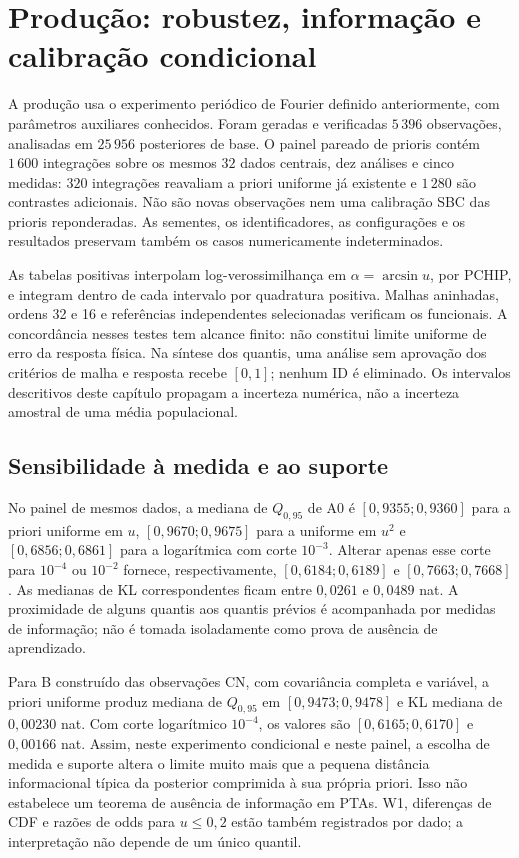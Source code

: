 \section{Produção: robustez, informação e calibração condicional}
\label{sec:c09-producao}

A produção usa o experimento periódico de Fourier definido anteriormente,
com parâmetros auxiliares conhecidos. Foram geradas e verificadas
\(5\,396\) observações, analisadas em \(25\,956\) posteriores de base.
O painel pareado de prioris contém \(1\,600\) integrações sobre os mesmos
\(32\) dados centrais, dez análises e cinco medidas: \(320\) integrações
reavaliam a priori uniforme já existente e \(1\,280\) são contrastes
adicionais. Não são novas observações nem uma calibração SBC das prioris
reponderadas. As sementes, os identificadores, as configurações e os
resultados preservam também os casos numericamente indeterminados.

As tabelas positivas interpolam log-verossimilhança em
\(\alpha=\arcsin u\), por PCHIP, e integram dentro de cada intervalo por
quadratura positiva. Malhas aninhadas, ordens 32 e 16 e referências
independentes selecionadas verificam os funcionais. A concordância nesses
testes tem alcance finito: não constitui limite uniforme de erro da
resposta física. Na síntese dos quantis, uma análise sem aprovação dos
critérios de malha e resposta recebe \([0,1]\); nenhum ID é eliminado.
Os intervalos descritivos deste capítulo propagam a incerteza numérica,
não a incerteza amostral de uma média populacional.

\subsection{Sensibilidade à medida e ao suporte}

No painel de mesmos dados, a mediana de \(Q_{0,95}\) de A0 é
\([0,9355;0,9360]\) para a priori uniforme em \(u\),
\([0,9670;0,9675]\) para a uniforme em \(u^2\) e
\([0,6856;0,6861]\) para a logarítmica com corte \(10^{-3}\).
Alterar apenas esse corte para \(10^{-4}\) ou \(10^{-2}\) fornece,
respectivamente, \([0,6184;0,6189]\) e \([0,7663;0,7668]\).
As medianas de KL correspondentes ficam entre \(0,0261\) e
\(0,0489\) nat. A proximidade de alguns quantis aos quantis prévios
é acompanhada por medidas de informação; não é tomada isoladamente como
prova de ausência de aprendizado.

Para B construído das observações CN, com covariância completa e variável,
a priori uniforme produz mediana de \(Q_{0,95}\) em
\([0,9473;0,9478]\) e KL mediana de \(0,00230\) nat. Com corte
logarítmico \(10^{-4}\), os valores são \([0,6165;0,6170]\) e
\(0,00166\) nat. Assim, neste experimento condicional e neste painel,
a escolha de medida e suporte altera o limite muito mais que a pequena
distância informacional típica da posterior comprimida à sua própria
priori. Isso não estabelece um teorema de ausência de informação em PTAs.
W1, diferenças de CDF e razões de odds para \(u\leq0,2\) estão também
registrados por dado; a interpretação não depende de um único quantil.

